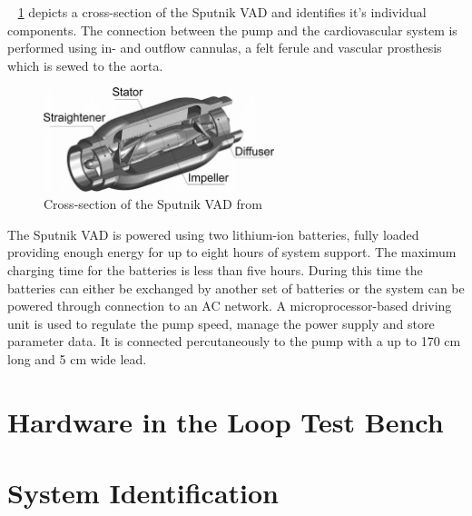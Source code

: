\figurename~ \ref{fig:sput_cross} depicts a cross-section of the Sputnik VAD and identifies it's individual components.
The connection between the pump and the cardiovascular system is performed using in- and outflow cannulas, a felt ferule and vascular prosthesis which is sewed to the aorta. \cite{Sputnik1}
\begin{figure}[h]
  \centering
  \includegraphics[width=0.6\textwidth]{images/sputnik_cross.png}
  \caption[Cross-section of Sputnik VAD]{Cross-section of the Sputnik VAD from \cite{Sputnik6}}
  \label{fig:sput_cross}
\end{figure}
The Sputnik VAD is powered using two lithium-ion batteries, fully loaded providing enough energy for up to eight hours of system support. The maximum charging time for the batteries is less than five hours. During this time the batteries can either be exchanged by another set of batteries or the system can be powered through connection to an AC network. A microprocessor-based driving unit is used to regulate the pump speed, manage the power supply and store parameter data. It is connected percutaneously to the pump with a up to 170 cm long and 5 cm wide lead. \cite{Sputnik1}

\section{Hardware in the Loop Test Bench}

\section{System Identification}
